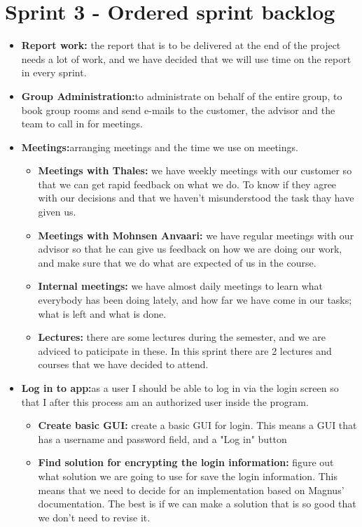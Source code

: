 

\section{Sprint 3 - Ordered sprint backlog}

\begin{itemize}
\item{}\textbf{Report work:} the report that is to be delivered at the end of the project needs a lot of work, and we have decided that we will use time on the report in every sprint.
\item{}\textbf{Group Administration:}to administrate on behalf of the entire group, to book group rooms and send e-mails to the customer, the advisor and the team to call in for meetings.
\item{}\textbf{Meetings:}arranging meetings and the time we use on meetings.
\begin{itemize}
\item{}\textbf{Meetings with Thales:} we have weekly meetings with our customer so that we can get rapid feedback on what we do. To know if they agree with our decisions and that we haven't misunderstood the task thay have given us.
\item{}\textbf{Meetings with Mohnsen Anvaari:} we have regular meetings with our advisor so that he can give us feedback on how we are doing our work, and make sure that we do what are expected of us in the course.
\item{}\textbf{Internal meetings:} we have almost daily meetings to learn what everybody has been doing lately, and how far we have come in our tasks; what is left and what is done.
\item{}\textbf{Lectures:} there are some lectures during the semester, and we are adviced to paticipate in these. In this sprint there are 2 lectures and courses that we have decided to attend.
\end{itemize}
\item{}\textbf{Log in to app:}as a user I should be able to log in via the login screen so that I after this process am an authorized user inside the program.
\begin{itemize}
\item{}\textbf{Create basic GUI:} create a basic GUI for login. This means a GUI that has a username and password field, and a "Log in" button
\item{}\textbf{Find solution for encrypting the login information:} figure out what solution we are going to use for save the login information. This means that we need to decide for an implementation based on Magnus' documentation. The best is if we can make a solution that is so good that we don’t need to revise it.

\end{itemize}
\end{itemize}
